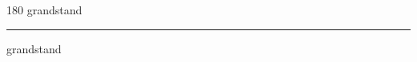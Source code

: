 
\begin{frame}
\begin{center}
\begin{turn}{180}
{\fontsize{2.5cm}{1em}\selectfont grandstand}
\end{turn}
\vspace{1em}\par  
\hrule
\vspace{1em}\par  
{\fontsize{2.5cm}{1em}\selectfont grandstand}
\end{center}
\end{frame}
